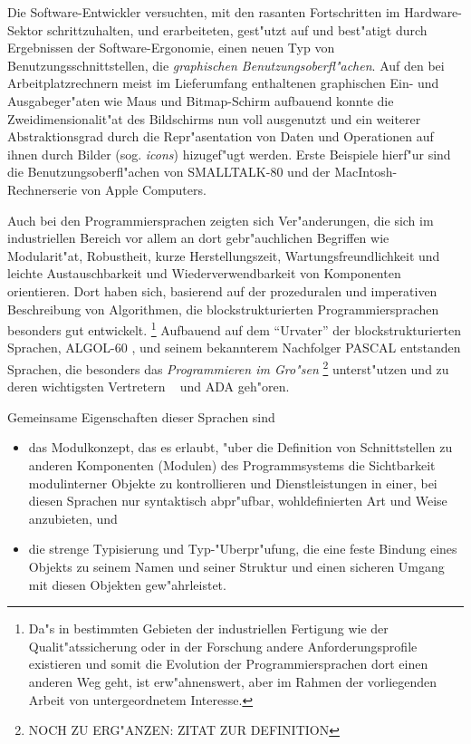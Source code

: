 Die Software-Entwickler versuchten, mit den rasanten Fortschritten im Hardware-Sektor
schrittzuhalten, und erarbeiteten, gest"utzt auf und best"atigt durch Ergebnissen
der Software-Ergonomie, einen neuen Typ von Benutzungsschnittstellen, die
{\em graphischen Benutzungsoberfl"achen}.
Auf den bei Arbeitplatzrechnern meist im Lieferumfang enthaltenen
graphischen Ein- und Ausgabeger"aten wie Maus und Bitmap-Schirm aufbauend konnte die
Zweidimensionalit"at des Bildschirms nun voll ausgenutzt und ein weiterer
Abstraktionsgrad durch die Repr"asentation von Daten und Operationen auf ihnen
durch Bilder (sog. {\it icons}) hizugef"ugt werden.
Erste Beispiele hierf"ur sind die Benutzungsoberfl"achen von \hbox{SMALLTALK-80}
\cite{smalltalk80} und der MacIntosh-Rechnerserie von Apple Computers.

Auch bei den Programmiersprachen zeigten sich Ver"anderungen, die sich im
industriellen Bereich vor allem an dort gebr"auchlichen Begriffen wie
Modularit"at, Robustheit, kurze Herstellungszeit, Wartungsfreundlichkeit
und leichte Austauschbarkeit und Wiederverwendbarkeit von Komponenten orientieren.
Dort haben sich, basierend auf der prozeduralen und imperativen Beschreibung
von Algorithmen, die blockstrukturierten Programmiersprachen besonders gut
entwickelt.
\footnote{Da"s in bestimmten Gebieten der industriellen
Fertigung wie der Qualit"atssicherung oder in der Forschung andere
Anforderungsprofile existieren und somit die Evolution der Programmiersprachen
dort einen anderen Weg geht, ist erw"ahnenswert, aber im Rahmen der vorliegenden
Arbeit von untergeordnetem Interesse.}
Aufbauend auf dem "`Urvater"' der blockstrukturierten Sprachen, \hbox{ALGOL-60}
\cite{algol60}, und seinem bekannterem Nachfolger \hbox{PASCAL} \cite{pascal}
entstanden Sprachen, die besonders das {\it Programmieren im Gro"sen\/}%
\footnote{NOCH ZU ERG"ANZEN: ZITAT ZUR DEFINITION}
unterst"utzen und zu deren wichtigsten Vertretern \modula\ \cite{modula-2} und \hbox{ADA}
\cite{ada} geh"oren.

Gemeinsame Eigenschaften dieser Sprachen sind

\begin{itemize}
\item das Modulkonzept, das es erlaubt, "uber die Definition von
  Schnittstellen zu anderen Komponenten (Modulen) des Programmsystems die
  Sichtbarkeit modulinterner Objekte zu kontrollieren und Dienstleistungen
  in einer, bei diesen Sprachen nur syntaktisch abpr"ufbar,
  wohldefinierten Art und Weise anzubieten, und
\item die strenge Typisierung und Typ-"Uberpr"ufung, die eine feste Bindung
  eines Objekts zu seinem Namen und seiner Struktur und einen sicheren
  Umgang mit diesen Objekten gew"ahrleistet.
\end{itemize}

